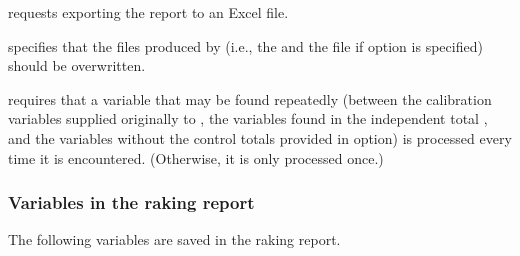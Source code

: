 \hangpara
{} requests exporting the report to an Excel file.

\hangpara
{} specifies that the files produced by  (i.e., the 
    and the {} file if  option is specified) should be overwritten.

\hangpara
{} requires that a variable that may be found repeatedly (between the calibration variables
    supplied originally to , the variables found in the independent total ,
    and the variables without the control totals provided in  option) is processed every
    time it is encountered. (Otherwise, it is only processed once.)

\subsubsection{Variables in the raking report}

The following variables are saved in the raking report.

\cnp


